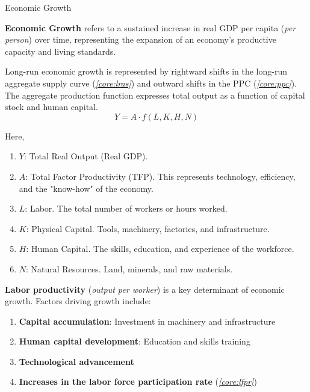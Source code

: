 \documentclass[10pt]{article}
\begin{document}
    \begin{core}{Economic Growth}

      \textbf{Economic Growth} refers to a sustained increase in real GDP per capita (\textit{per person}) over time, representing the expansion of an economy's productive capacity and living standards.

      Long-run economic growth is represented by rightward shifts in the long-run aggregate supply curve (\textit{\autoref{core:lras}}) and outward shifts in the PPC (\textit{\autoref{core:ppc}}). The aggregate production function expresses total output as a function of capital stock and human capital.
      \[
        Y = A \cdot f(L, K, H, N)
      \]

      Here, 

      \begin{enumerate}

        \item $Y$: Total Real Output (Real GDP).
          
        \item $A$: Total Factor Productivity (TFP). This represents technology, efficiency, and the "know-how" of the economy.
          
        \item $L$: Labor. The total number of workers or hours worked.
          
        \item $K$: Physical Capital. Tools, machinery, factories, and infrastructure.
          
        \item $H$: Human Capital. The skills, education, and experience of the workforce.
          
        \item $N$: Natural Resources. Land, minerals, and raw materials.
          
      \end{enumerate}

      \textbf{Labor productivity} (\textit{output per worker}) is a key determinant of economic growth. Factors driving growth include:

      \begin{enumerate}

        \item \textbf{Capital accumulation}: Investment in machinery and infrastructure

        \item \textbf{Human capital development}: Education and skills training

        \item \textbf{Technological advancement}

        \item \textbf{Increases in the labor force participation rate} (\textit{\autoref{core:lfpr}})

      \end{enumerate}

    \end{core}
\end{document}
